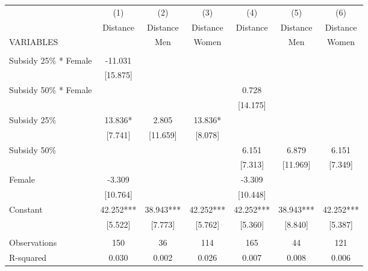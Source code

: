 \begin{tabular}{lcccccc} \hline
 & (1) & (2) & (3) & (4) & (5) & (6) \\
 & Distance & Distance & Distance & Distance & Distance & Distance \\
VARIABLES &  & Men & Women &  & Men & Women \\ \hline
 &  &  &  &  &  &  \\
Subsidy 25\% * Female & -11.031 &  &  &  &  &  \\
 & [15.875] &  &  &  &  &  \\
Subsidy 50\% * Female &  &  &  & 0.728 &  &  \\
 &  &  &  & [14.175] &  &  \\
Subsidy 25\% & 13.836* & 2.805 & 13.836* &  &  &  \\
 & [7.741] & [11.659] & [8.078] &  &  &  \\
Subsidy 50\% &  &  &  & 6.151 & 6.879 & 6.151 \\
 &  &  &  & [7.313] & [11.969] & [7.349] \\
Female & -3.309 &  &  & -3.309 &  &  \\
 & [10.764] &  &  & [10.448] &  &  \\
Constant & 42.252*** & 38.943*** & 42.252*** & 42.252*** & 38.943*** & 42.252*** \\
 & [5.522] & [7.773] & [5.762] & [5.360] & [8.840] & [5.387] \\
 &  &  &  &  &  &  \\
Observations & 150 & 36 & 114 & 165 & 44 & 121 \\
 R-squared & 0.030 & 0.002 & 0.026 & 0.007 & 0.008 & 0.006 \\ \hline
\end{tabular}
